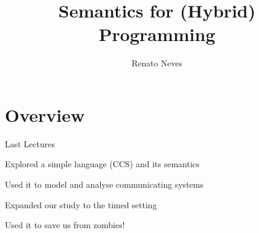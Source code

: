 \documentclass{beamer}
\author[Renato Neves]{Renato Neves}
\date{}
\begin{document}
\title{Semantics for (Hybrid) Programming}

\frame[plain]{\titlepage}

\section{Overview}

\begin{frame}{Last Lectures}
       
       Explored a simple language (\textsc{CCS}) and its semantics

       Used it to model and analyse \alert{communicating} systems

       Expanded our study to the \alert{timed} setting
       
       Used it to save us from zombies!

\end{frame}
\end{document}
